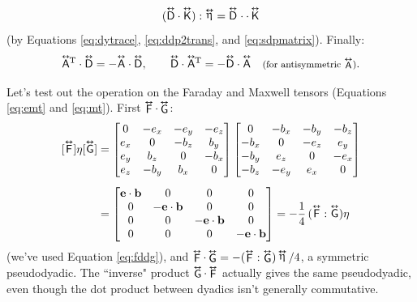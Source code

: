 \documentclass[12pt]{article}
\renewcommand{\vv}[1]{\mathbf{#1}}
\newcommand{\tightoverset}[2]{%
  \mathop{#2}\limits^{\vbox to -.5ex{\kern-0.75ex\hbox{$#1$}\vss}}}
\newcommand{\inlinedy}[1]{\tightoverset{\text{\tiny$\bm\leftrightarrow$}}{#1}}
\newcommand{\fnoverset}[2]{%
  \mathop{#2}\limits^{\vbox to -.5ex{\kern-0.85ex\hbox{$#1$}\vss}}}
\newcommand{\footnotedy}[1]{\fnoverset{\text{\tiny$\bm\leftrightarrow$}}{#1}}
\newcommand{\capdy}[1]{ \overset{ \text{\tiny$\bm\leftrightarrow$} }{\vphantom{\text{\small{A}}}\smash{#1}} }
\begin{document}
\begin{equation}\label{eq:sdptrace}
(\capdy{\mathsf{D}} \cdot \capdy{\mathsf{K}}) : \inlinedy{\upeta} = \capdy{\mathsf{D}} \mkern1mu \cdot \cdot \, \capdy{\mathsf{K}}
\end{equation}
(by Equations \ref{eq:dytrace}, \ref{eq:ddp2trans}, and \ref{eq:sdpmatrix}). Finally:
\begin{equation}\label{eq:sdpantisym}
\capdy{\mathsf{A}} \mkern-2mu ^\mathrm{\mkern1mu T} \cdot \capdy{\mathsf{D}} = - \capdy{\mathsf{A}} \cdot \capdy{\mathsf{D}}, \quad \quad \capdy{\mathsf{D}} \cdot \capdy{\mathsf{A}} \mkern-2mu ^\mathrm{\mkern1mu T} = - \capdy{\mathsf{D}} \cdot \capdy{\mathsf{A}}  \quad \text{\footnotesize{(for antisymmetric $\footnotedy{\mathsf{A}}$)}}.
\end{equation}

Let's test out the operation on the Faraday and Maxwell tensors (Equations \ref{eq:emt} and \ref{eq:mt}). First $\inlinedy{\mathsf{F}} \cdot \inlinedy{\mathsf{G}}$:
\begin{equation*}
\begin{aligned}
\mkern0mu [\capdy{\mathsf{F}}] \eta [\capdy{\mathsf{G}}]
&=
\begin{bmatrix}
0 & -e_x & -e_y & -e_z \\
e_x & 0 & -b_z & b_y \\
e_y & b_z & 0 & -b_x \\
e_z & -b_y & b_x & 0
\end{bmatrix}
\begin{bmatrix}
0 & -b_x & -b_y & -b_z \\
-b_x & 0 & -e_z & e_y \\
-b_y & e_z & 0 & -e_x \\
-b_z & -e_y & e_x & 0
\end{bmatrix} \\[5pt]
&=
\begin{bmatrix}
\vv e \cdot \vv b & 0 & 0 & 0 \\
0 & - \vv e \cdot \vv b & 0 & 0 \\
0 & 0 & - \vv e \cdot \vv b & 0 \\
0 & 0 & 0 & - \vv e \cdot \vv b
\end{bmatrix}
=
- \dfrac{1}{4} \, ( \capdy{\mathsf{F}} : \capdy{\mathsf{G}} ) \eta
\end{aligned}
\end{equation*}
(we've used Equation \ref{eq:fddg}), and $\inlinedy{\mathsf{F}} \cdot \inlinedy{\mathsf{G}} = - ( \inlinedy{\mathsf{F}} : \inlinedy{\mathsf{G}} ) \inlinedy{\upeta} / 4$, a symmetric pseudodyadic. The ``inverse" product $\inlinedy{\mathsf{G}} \cdot \inlinedy{\mathsf{F}}$ actually gives the same pseudodyadic, even though the dot product between dyadics isn't generally commutative.
\end{document}
